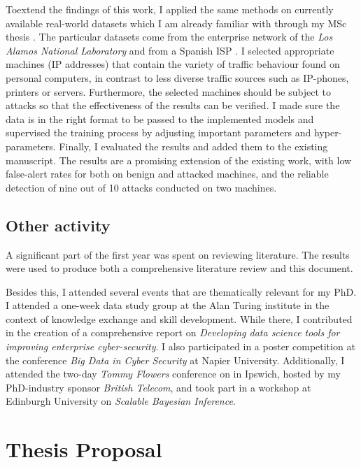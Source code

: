 \documentclass[a4paper,12pt,twoside]{report}
\begin{document}
Toextend the findings of this work, I applied the same methods on currently available real-world datasets which I am already familiar with through my MSc thesis \cite{clausen2018bayesian}. The particular datasets come from the enterprise network of the \textit{Los Alamos National Laboratory} \cite{kent-2015-cyberdata1} and from a Spanish ISP \cite{macia2018ugr}. I selected appropriate machines (IP addresses) that contain the variety of traffic behaviour found on personal computers, in contrast to less diverse traffic sources such as IP-phones, printers or servers. Furthermore, the selected machines should be subject to attacks so that the effectiveness of the results can be verified. I made sure the data is in the right format to be passed to the implemented models and supervised the training process by adjusting important parameters and hyper-parameters. Finally, I evaluated the results and added them to the existing manuscript. The results are a promising extension of the existing work,
with low false-alert rates for both on benign and attacked machines, and the reliable detection of nine out of 10 attacks conducted on two machines. 

\section{Other activity}

A significant part of the first year was spent on reviewing literature. The results were used to produce both a comprehensive literature review and this document. 


Besides this, I attended several events that are thematically relevant for my PhD. I attended a one-week data study group at the Alan Turing institute in the context of knowledge exchange and skill development. While there, I contributed in the creation of a comprehensive report on \textit{Developing data science tools for improving enterprise cyber-security}. I also participated in a poster competition at the conference \textit{Big Data in Cyber Security} at Napier University. Additionally, I attended the two-day \textit{Tommy Flowers} conference on  in Ipswich, hosted by my PhD-industry sponsor \textit{British Telecom}, and took part in a workshop at Edinburgh University on \textit{Scalable Bayesian Inference}.







\chapter{Thesis Proposal}\label{Obj}
\end{document}
